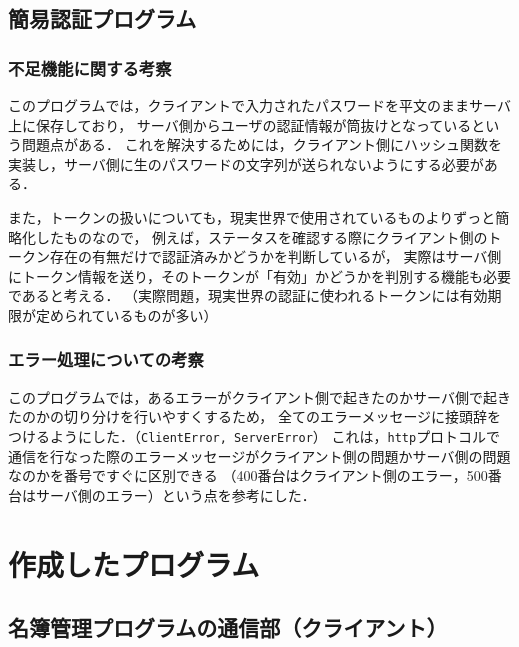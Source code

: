 \documentclass[11pt]{jsarticle}
\begin{document}
\subsection{簡易認証プログラム}

\subsubsection{不足機能に関する考察}
このプログラムでは，クライアントで入力されたパスワードを平文のままサーバ上に保存しており，
サーバ側からユーザの認証情報が筒抜けとなっているという問題点がある．
これを解決するためには，クライアント側にハッシュ関数を実装し，サーバ側に生のパスワードの文字列が送られないようにする必要がある．

また，トークンの扱いについても，現実世界で使用されているものよりずっと簡略化したものなので，
例えば，ステータスを確認する際にクライアント側のトークン存在の有無だけで認証済みかどうかを判断しているが，
実際はサーバ側にトークン情報を送り，そのトークンが「有効」かどうかを判別する機能も必要であると考える．
（実際問題，現実世界の認証に使われるトークンには有効期限が定められているものが多い）

\subsubsection{エラー処理についての考察}

このプログラムでは，あるエラーがクライアント側で起きたのかサーバ側で起きたのかの切り分けを行いやすくするため，
全てのエラーメッセージに接頭辞をつけるようにした．（{\tt ClientError, ServerError}） 
これは，{\tt http}プロトコルで通信を行なった際のエラーメッセージがクライアント側の問題かサーバ側の問題なのかを番号ですぐに区別できる
（400番台はクライアント側のエラー，500番台はサーバ側のエラー）という点を参考にした．

\section{作成したプログラム}

\subsection{名簿管理プログラムの通信部（クライアント）} \label{sec:client.c}
\end{document}

